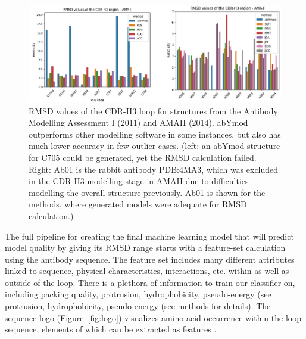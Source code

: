 \documentclass[12pt]{article}
\begin{document}
\begin{figure}
  \centering
  \includegraphics[scale=0.3]{AMA.eps}
  \caption {RMSD values of the CDR-H3 loop for structures from the
    Antibody Modelling Assessment I (2011) and AMAII (2014). abYmod
    outperforms other modelling software in some instances, but also
    has much lower accuracy in few outlier cases. (left: an abYmod
    structure for C705 could be generated, yet the RMSD calculation
    failed. Right: Ab01 is the rabbit antibody PDB:4MA3, which was
    excluded in the CDR-H3 modelling stage in AMAII due to
    difficulties modelling the overall structure previously. Ab01 is
    shown for the methods, where generated models were adequate for
    RMSD calculation.)}
  \label{fig:AMA}
\end{figure}

The full pipeline for creating the final machine learning model that
will predict model quality by giving its RMSD range starts with a
feature-set calculation using the antibody sequence. The feature set
includes many different attributes linked to sequence, physical
characteristics, interactions, etc. within as well as outside of the
loop. There is a plethora of information to train our classifier on,
including packing quality, protrusion, hydrophobicity, pseudo-energy
(see protrusion, hydrophobicity, pseudo-energy (see methods for
details). The sequence logo (Figure~\ref{fig:logo}) visualizes amino acid
occurrence within the loop sequence, elements of which can be
extracted as features \cite{Thomsen2012,Shaner1993}.
\end{document}
